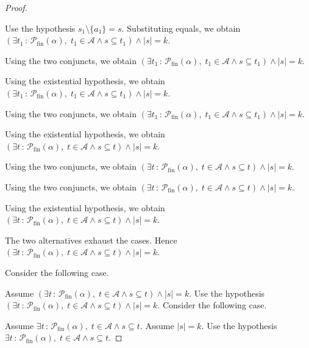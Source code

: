 \documentclass{article}
\theoremstyle{paperresult}
\newenvironment{proofstep}{\par\smallskip\ifdim\leftskip<3em\relax\advance\leftskip by 1em\relax\fi\noindent\ignorespaces}{\par\smallskip}
\begin{document}
\begin{proof}
\begin{proofstep}
\begin{proofstep}
\begin{proofstep}
\begin{proofstep}
\begin{proofstep}
\begin{proofstep}
\begin{proofstep}
\begin{proofstep}
\begin{proofstep}
\begin{proofstep}
Use the hypothesis \(s_{1} \setminus \{a_{1}\} = s\).
Substituting equals, we obtain \((\exists t_{1}\, :\, \mathcal{P}_{\mathrm{fin}}(\alpha),\; t_{1} \in \mathcal{A} \land s \subseteq t_{1}) \land |s| = k\).
\end{proofstep}
Using the two conjuncts, we obtain \((\exists t_{1}\, :\, \mathcal{P}_{\mathrm{fin}}(\alpha),\; t_{1} \in \mathcal{A} \land s \subseteq t_{1}) \land |s| = k\).
\end{proofstep}
Using the existential hypothesis, we obtain \((\exists t_{1}\, :\, \mathcal{P}_{\mathrm{fin}}(\alpha),\; t_{1} \in \mathcal{A} \land s \subseteq t_{1}) \land |s| = k\).
\end{proofstep}
Using the two conjuncts, we obtain \((\exists t_{1}\, :\, \mathcal{P}_{\mathrm{fin}}(\alpha),\; t_{1} \in \mathcal{A} \land s \subseteq t_{1}) \land |s| = k\).
\end{proofstep}
Using the existential hypothesis, we obtain \((\exists t\, :\, \mathcal{P}_{\mathrm{fin}}(\alpha),\; t \in \mathcal{A} \land s \subseteq t) \land |s| = k\).
\end{proofstep}
Using the two conjuncts, we obtain \((\exists t\, :\, \mathcal{P}_{\mathrm{fin}}(\alpha),\; t \in \mathcal{A} \land s \subseteq t) \land |s| = k\).
\end{proofstep}
Using the two conjuncts, we obtain \((\exists t\, :\, \mathcal{P}_{\mathrm{fin}}(\alpha),\; t \in \mathcal{A} \land s \subseteq t) \land |s| = k\).
\end{proofstep}
Using the existential hypothesis, we obtain \((\exists t\, :\, \mathcal{P}_{\mathrm{fin}}(\alpha),\; t \in \mathcal{A} \land s \subseteq t) \land |s| = k\).
\end{proofstep}
The two alternatives exhaust the cases. Hence \((\exists t\, :\, \mathcal{P}_{\mathrm{fin}}(\alpha),\; t \in \mathcal{A} \land s \subseteq t) \land |s| = k\).
\end{proofstep}
Consider the following case.
\begin{proofstep}
Assume \((\exists t\, :\, \mathcal{P}_{\mathrm{fin}}(\alpha),\; t \in \mathcal{A} \land s \subseteq t) \land |s| = k\).
Use the hypothesis \((\exists t\, :\, \mathcal{P}_{\mathrm{fin}}(\alpha),\; t \in \mathcal{A} \land s \subseteq t) \land |s| = k\).
Consider the following case.
\begin{proofstep}
Assume \(\exists t\, :\, \mathcal{P}_{\mathrm{fin}}(\alpha),\; t \in \mathcal{A} \land s \subseteq t\).
Assume \(\left|s\right| = k\).
Use the hypothesis \(\exists t\, :\, \mathcal{P}_{\mathrm{fin}}(\alpha),\; t \in \mathcal{A} \land s \subseteq t\).

\end{proofstep}
\end{proofstep}
\end{proofstep}
\end{proof}
\end{document}
